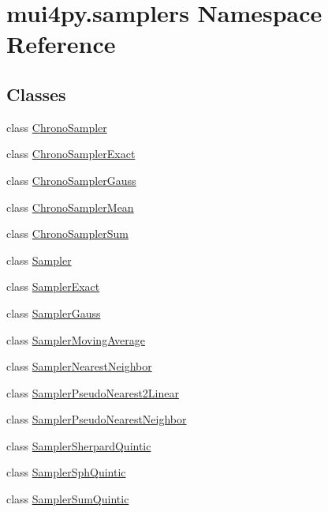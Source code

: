 \hypertarget{namespacemui4py_1_1samplers}{}\section{mui4py.\+samplers Namespace Reference}
\label{namespacemui4py_1_1samplers}
\subsection*{Classes}
\begin{DoxyCompactItemize}
\item 
class \hyperlink{classmui4py_1_1samplers_1_1_chrono_sampler}{Chrono\+Sampler}
\item 
class \hyperlink{classmui4py_1_1samplers_1_1_chrono_sampler_exact}{Chrono\+Sampler\+Exact}
\item 
class \hyperlink{classmui4py_1_1samplers_1_1_chrono_sampler_gauss}{Chrono\+Sampler\+Gauss}
\item 
class \hyperlink{classmui4py_1_1samplers_1_1_chrono_sampler_mean}{Chrono\+Sampler\+Mean}
\item 
class \hyperlink{classmui4py_1_1samplers_1_1_chrono_sampler_sum}{Chrono\+Sampler\+Sum}
\item 
class \hyperlink{classmui4py_1_1samplers_1_1_sampler}{Sampler}
\item 
class \hyperlink{classmui4py_1_1samplers_1_1_sampler_exact}{Sampler\+Exact}
\item 
class \hyperlink{classmui4py_1_1samplers_1_1_sampler_gauss}{Sampler\+Gauss}
\item 
class \hyperlink{classmui4py_1_1samplers_1_1_sampler_moving_average}{Sampler\+Moving\+Average}
\item 
class \hyperlink{classmui4py_1_1samplers_1_1_sampler_nearest_neighbor}{Sampler\+Nearest\+Neighbor}
\item 
class \hyperlink{classmui4py_1_1samplers_1_1_sampler_pseudo_nearest2_linear}{Sampler\+Pseudo\+Nearest2\+Linear}
\item 
class \hyperlink{classmui4py_1_1samplers_1_1_sampler_pseudo_nearest_neighbor}{Sampler\+Pseudo\+Nearest\+Neighbor}
\item 
class \hyperlink{classmui4py_1_1samplers_1_1_sampler_sherpard_quintic}{Sampler\+Sherpard\+Quintic}
\item 
class \hyperlink{classmui4py_1_1samplers_1_1_sampler_sph_quintic}{Sampler\+Sph\+Quintic}
\item 
class \hyperlink{classmui4py_1_1samplers_1_1_sampler_sum_quintic}{Sampler\+Sum\+Quintic}
\end{DoxyCompactItemize}
